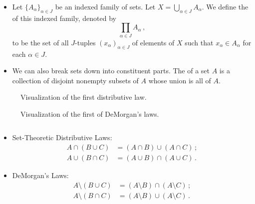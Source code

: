 \begin{itemize}
	\item Let $\{ A_\alpha \}_{\alpha \in J}$ be an indexed family 
	of sets. Let $X = \bigcup_{\alpha \in J} A_\alpha$. We define 
	the  of this 
	indexed family, denoted by 
	\[
		\prod_{\alpha \in J} A_\alpha\,,
	\]
	to be the set of all $J$-tuples $(x_\alpha)_{\alpha \in J}$ of 
	elements of $X$ such that $x_\alpha \in A_\alpha$ for each 
	$\alpha \in J$.
	
	\item We can also break sets down into constituent parts. The 
	 of a set $A$ is a 
	collection 
	of disjoint nonempty subsets of $A$ whose union is all of $A$.
\end{itemize}

\begin{marginfigure}[.25in]
	\begin{subfigure}{2in}
		\centering
		\begin{venndiagram3sets}[
			tikzoptions={scale=.5,thick},
			shade=pink
			]
			\fillACapB 	\fillACapC
		\end{venndiagram3sets}
		\caption{Visualization of the first distributive law.}
	\end{subfigure}
	\begin{subfigure}{2in}
		\centering
		\begin{venndiagram3sets}[
			tikzoptions={scale=.5,thick},
			shade=pink
			]
			\fillOnlyA
		\end{venndiagram3sets}
		\caption{Visualization of the first of DeMorgan's laws.}
	\end{subfigure}
\end{marginfigure}

\begin{theorem}
	$ $
	\begin{itemize}
		\item Set-Theoretic Distributive Laws:
		\begin{align}
			A \cap (B \cup C) &= (A \cap B) \cup (A \cap C)\,; \\
			A \cup (B \cap C) &= (A \cup B) \cap (A \cup C)\,.
		\end{align}
	
		\item DeMorgan's Laws:
		\begin{align}
			A \setminus (B \cup C)
				&= (A \setminus B) \cap (A \setminus C)\,; \\
			A \setminus (B \cap C)
				&= (A \setminus B) \cup (A \setminus C)\,.
		\end{align}
	\end{itemize}
\end{theorem}

